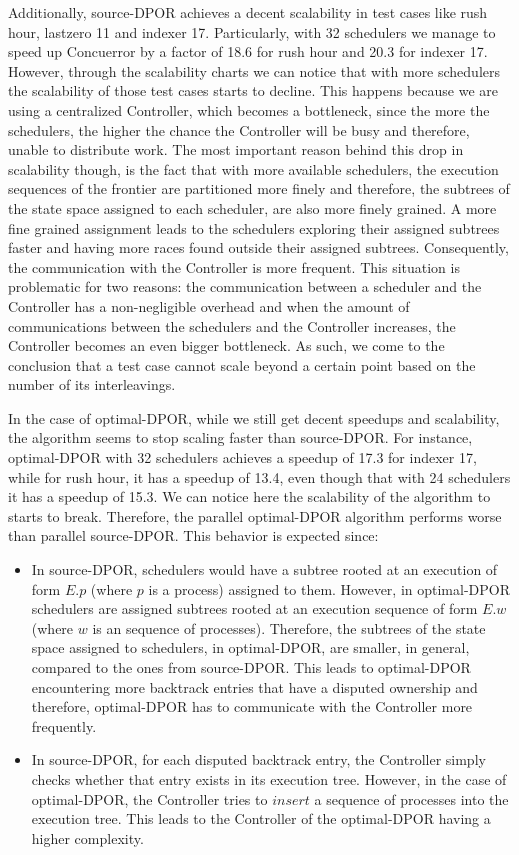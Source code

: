 Additionally, source-DPOR achieves a decent scalability in test cases like rush hour, lastzero 11 and indexer 17. Particularly, with
32 schedulers we manage to speed up Concuerror by a factor of 18.6 for rush hour and 20.3 for indexer 17. However, through the scalability charts 
we can notice that with more schedulers the scalability of those test cases starts to decline. This happens because we
are using a centralized Controller, which becomes a bottleneck, since the more the schedulers, the
higher the chance the Controller will be busy and therefore, unable to distribute work. The most important reason 
behind this drop in scalability though, is the fact that with more available schedulers, the execution sequences of the frontier are partitioned more finely and therefore, the subtrees of the state space assigned to each scheduler, are also more finely grained. A more fine grained assignment leads to the schedulers exploring their
assigned subtrees faster and having more races found outside their assigned subtrees.
Consequently, the communication with the Controller is more frequent. This situation is problematic for two reasons:
the communication between a scheduler and the Controller has a non-negligible overhead and when the amount of 
communications between the schedulers and the Controller increases, the Controller becomes an even bigger bottleneck.
As such, we come to the conclusion that a test case cannot scale beyond a certain point based on the number of its interleavings.

In the case of optimal-DPOR, while we still get decent speedups and scalability, the algorithm seems to stop scaling faster than source-DPOR. For instance, optimal-DPOR with 32 schedulers achieves a speedup of 17.3 for indexer 17, while for rush hour, it has a speedup of 13.4, even though that with 24 schedulers it has a speedup of 15.3. We can notice here the scalability of the algorithm to starts to break. Therefore, the parallel optimal-DPOR algorithm performs worse than parallel source-DPOR. This behavior is expected since:

\begin{itemize}

\item In source-DPOR, schedulers would have a subtree rooted at an execution of form $E.p$ (where $p$ is a process) assigned to them. However, in optimal-DPOR schedulers are assigned subtrees rooted at an execution sequence of form $E.w$ (where $w$ is an sequence of processes). Therefore, the subtrees of the state space assigned to schedulers, in optimal-DPOR, are smaller, in general, compared to the ones from source-DPOR. This leads to optimal-DPOR encountering more backtrack entries that have a disputed ownership and therefore, optimal-DPOR has to communicate with the Controller more frequently.
\item In source-DPOR, for each disputed backtrack entry, the Controller simply checks whether that entry exists in its execution tree. However, in the case of optimal-DPOR, the Controller tries to $insert$ a sequence of processes into the execution tree. This leads to the Controller of the optimal-DPOR having a higher complexity.

\end{itemize}

